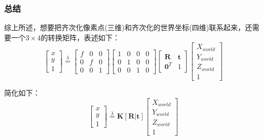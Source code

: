 \documentclass[12pt]{article}
\begin{document}
\subsubsection{总结}
综上所述，想要把齐次化像素点(三维)和齐次化的世界坐标(四维)联系起来，还需要一个$3\times 4$的转换矩阵，表述如下：
\begin{equation}
    \left[\begin{array}{l}
        x \\
        y \\
        1
        \end{array}\right]\overset{\lambda}{=}\left[\begin{array}{lll}
        f & 0 & 0 \\
        0 & f & 0 \\
        0 & 0 & 1
        \end{array}\right]\left[\begin{array}{llll}
        1 & 0 & 0 & 0 \\
        0 & 1 & 0 & 0 \\
        0 & 0 & 1 & 0
        \end{array}\right]\left[\begin{array}{cc}
        \mathbf{R} & \mathbf{t} \\
        \mathbf{0}^{T} & 1
        \end{array}\right]\left[\begin{array}{c}
        X_{world} \\
        Y_{world} \\
        Z_{world} \\
        1
        \end{array}\right]
\end{equation}

简化如下：
\begin{equation}
    \label{eq:xjmx}
    \left[
        \begin{array}{l}
            x \\
            y \\
            1
        \end{array}
    \right]\overset{\lambda}{=}
    \mathbf{K}\left[\mathbf{R|\mathbf{t}}\right]\left[
        \begin{array}{l}
            X_{world} \\
            Y_{world} \\
            Z_{world} \\
            1
        \end{array}
    \right]
\end{equation}
\end{document}
